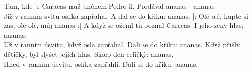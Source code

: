 \ve{}
Tam, kde je Caracas muž jménem Pedro il.
Prodával ananas - ananas\\
Již v ranním svitu oslíka zapřahal.
A dal se do křiku: ananas.
\cho{}
|: Olé olé, kupte si zas, olé olé, můj ananas :|
\ve{}
A když se oženil tu poznal Caracas.
I jeho ženy hlas: ananas.\\
Už v ranním úsvitu, když osla zapřahal.
Dali se do křiku: ananas.
\cho{}
\ve{}
Když přišly dětičky, byl slyšet jejich hlas.
Skoro den celičký: ananas.\\
Hned v ranním úsvitu, oslíka zapřáhli.
Dali se do křiku: ananas.
\cho{}
\esong{}
